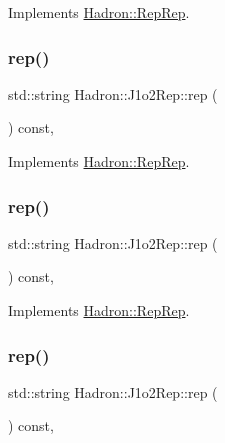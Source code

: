 Implements \mbox{\hyperlink{structHadron_1_1RepRep_ab3213025f6de249f7095892109575fde}{Hadron\+::\+Rep\+Rep}}.

\mbox{\label{structHadron_1_1J1o2Rep_a4e049281173fb575d28821d31e36df00}} 
\subsubsection{\texorpdfstring{rep()}{rep()}\hspace{0.1cm}{\footnotesize\ttfamily [2/5]}}
{\footnotesize\ttfamily std\+::string Hadron\+::\+J1o2\+Rep\+::rep (\begin{DoxyParamCaption}{ }\end{DoxyParamCaption}) const\hspace{0.3cm}{\ttfamily [inline]}, {\ttfamily [virtual]}}



Implements \mbox{\hyperlink{structHadron_1_1RepRep_ab3213025f6de249f7095892109575fde}{Hadron\+::\+Rep\+Rep}}.

\mbox{\label{structHadron_1_1J1o2Rep_a4e049281173fb575d28821d31e36df00}} 
\subsubsection{\texorpdfstring{rep()}{rep()}\hspace{0.1cm}{\footnotesize\ttfamily [3/5]}}
{\footnotesize\ttfamily std\+::string Hadron\+::\+J1o2\+Rep\+::rep (\begin{DoxyParamCaption}{ }\end{DoxyParamCaption}) const\hspace{0.3cm}{\ttfamily [inline]}, {\ttfamily [virtual]}}



Implements \mbox{\hyperlink{structHadron_1_1RepRep_ab3213025f6de249f7095892109575fde}{Hadron\+::\+Rep\+Rep}}.

\mbox{\label{structHadron_1_1J1o2Rep_a4e049281173fb575d28821d31e36df00}} 
\subsubsection{\texorpdfstring{rep()}{rep()}\hspace{0.1cm}{\footnotesize\ttfamily [4/5]}}
{\footnotesize\ttfamily std\+::string Hadron\+::\+J1o2\+Rep\+::rep (\begin{DoxyParamCaption}{ }\end{DoxyParamCaption}) const\hspace{0.3cm}{\ttfamily [inline]}, {\ttfamily [virtual]}}



